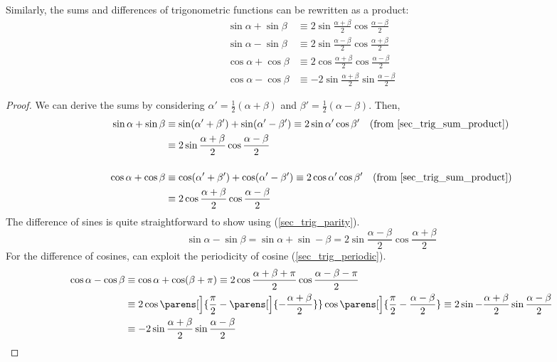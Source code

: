 \begin{theorem}
 Similarly, the sums and differences of trigonometric functions can be rewritten
 as a product:
 \begin{align*}
  \sin \alpha + \sin \beta &\equiv
      2 \sin \frac{\alpha + \beta}2 \cos \frac{\alpha - \beta}2 \\
  \sin \alpha - \sin \beta &\equiv
      2 \sin \frac{\alpha - \beta} 2 \cos\frac{\alpha + \beta} 2 \\
  \cos \alpha + \cos \beta &\equiv
      2 \cos\frac{\alpha + \beta} 2 \cos \frac{\alpha - \beta} 2 \\
  \cos \alpha - \cos \beta &\equiv
   -2 \sin \frac{\alpha + \beta} 2 \sin \frac{\alpha - \beta} 2
 \end{align*}
 \end{theorem}
\begin{proof}
 We can derive the sums by considering \(\alpha' = \frac 12 (\alpha + \beta)\)
 and \(\beta' = \frac 12 (\alpha - \beta)\). Then,
 \begin{align*}
  \sin \alpha + \sin \beta &\equiv
   \sin(\alpha' + \beta') + \sin(\alpha' - \beta') \equiv
   2\sin \alpha' \cos \beta'\quad \text{(from \ref{sec_trig_sum_product})}
  \\&\equiv 2 \sin \frac{\alpha + \beta}2 \cos \frac{\alpha - \beta} 2 \\[3ex]
   \cos \alpha + \cos \beta &\equiv
   \cos(\alpha' + \beta') + \cos(\alpha' - \beta') \equiv
   2\cos \alpha' \cos \beta'\quad \text{(from \ref{sec_trig_sum_product})}
   \\&\equiv 2 \cos\frac{\alpha + \beta} 2 \cos \frac{\alpha - \beta} 2
 \end{align*}
 The difference of sines is quite straightforward to show using
 (\ref{sec_trig_parity}).
 \begin{equation*}
  \sin \alpha - \sin \beta =
      \sin \alpha + \sin -\beta =
      2 \sin \frac{\alpha - \beta} 2 \cos\frac{\alpha + \beta} 2
 \end{equation*}
 For the difference of cosines, can exploit the periodicity of cosine
 (\ref{sec_trig_periodic}).
 \begin{align*}
  \cos \alpha - \cos \beta &\equiv
  \cos \alpha + \cos (\beta + \pi)  \equiv
  2 \cos \frac{\alpha + \beta + \pi} 2 \cos \frac {\alpha - \beta - \pi} 2
  \\&\equiv
  2 \cos \parens[\Big]{\frac \pi 2 - \parens[\Big]{-\frac{\alpha + \beta} 2}}
    \cos \parens[\Big]{\frac \pi 2 - \frac{\alpha - \beta} 2} \equiv
  2 \sin -\frac{\alpha + \beta} 2 \sin \frac{\alpha - \beta} 2 \\&\equiv
  -2 \sin \frac{\alpha + \beta} 2 \sin \frac{\alpha - \beta} 2 \qedhere
 \end{align*}
\end{proof}

